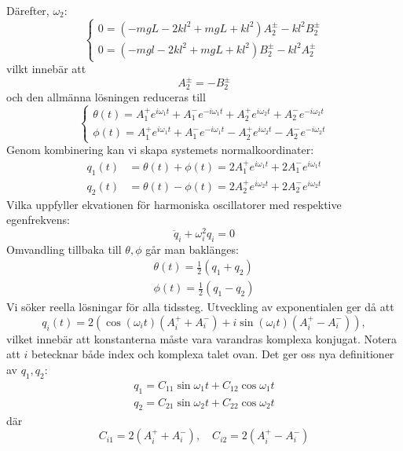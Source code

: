 Därefter, $\omega_2$: \begin{equation}
    \begin{cases}
        0 = (-mgL-2kl^2+mgL+kl^2)A_2^\pm-{kl^2}B_2^\pm \\
            0 = (-mgl-2kl^2+mgL+kl^2)B_2^\pm-{kl^2}A_2^\pm
    \end{cases}
\end{equation}
vilkt innebär att \begin{equation}
    A_2^\pm = -B_2^\pm
\end{equation}
och den allmänna lösningen reduceras till \begin{equation}
    \begin{cases}
        \theta(t) = A_1^+e^{i\omega_1t}+A_1^-e^{-i\omega_1t}+A_2^+e^{i\omega_2t}+A_2^-e^{-i\omega_2t}\\
        \phi(t) = A_1^+e^{i\omega_1t}+A_1^-e^{-i\omega_1t}-A_2^+e^{i\omega_2t}-A_2^-e^{-i\omega_2t}
    \end{cases}
\end{equation}
Genom kombinering kan vi skapa systemets normalkoordinater: \begin{align}
    q_1(t) &= \theta(t)+\phi(t) = 2A_1^+ e^{i\omega_1t} +2A_1^-e^{i\omega_1 t}\\
    q_2(t) &= \theta(t)-\phi(t) = 2A_2^+ e^{i\omega_2t} +2A_2^-e^{i\omega_2 t}
\end{align}
Vilka uppfyller ekvationen för harmoniska oscillatorer med respektive egenfrekvens: \begin{equation}
    \ddot{q}_i+\omega_i^2 q_i = 0
\end{equation}
Omvandling tillbaka till $\theta,\phi$ går man baklänges: \begin{align}
    \theta(t) = \frac{1}{2}(q_1+q_2)\\
    \phi(t) = \frac{1}{2}(q_1-q_2)
\end{align}
Vi söker reella lösningar för alla tidssteg. Utveckling av exponentialen ger då att \begin{equation}
    q_i(t) = 2\left( \cos(\omega_i t)(A_i^++A_i^-)+i\sin(\omega_i t)(A_i^+-A_i^-) \right),
\end{equation}
vilket innebär att konstanterna måste vara varandras komplexa konjugat. Notera att $i$ betecknar både index och komplexa talet ovan. Det ger oss nya definitioner av $q_1,q_2$: 
\begin{align}
    q_1 = C_{11}\sin \omega_1 t + C_{12} \cos \omega_1 t\\
    q_2= C_{21}\sin \omega_2 t + C_{22}\cos \omega_2 t
\end{align}
där
\begin{equation}
    C_{i1} = 2(A_i^+ + A_i^-),\quad C_{i2} = 2(A_i^+-A_i^-)
\end{equation}

